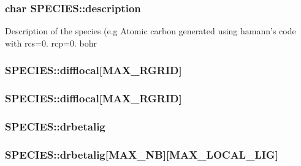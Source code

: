 \hypertarget{struct_s_p_e_c_i_e_s_adeaff9956fe2e820c6050e7a2dee34d3}{
\subsubsection[{description}]{\setlength{\rightskip}{0pt plus 5cm}char S\-P\-E\-C\-I\-E\-S\-::description}}\label{struct_s_p_e_c_i_e_s_adeaff9956fe2e820c6050e7a2dee34d3}
Description of the species (e.\-g Atomic carbon generated using hamann's code with rcs=0. rcp=0. bohr \hypertarget{struct_s_p_e_c_i_e_s_ac9604ebb323031275c739b0195d10cb7}{
\subsubsection[{difflocal}]{ S\-P\-E\-C\-I\-E\-S\-::difflocal\mbox{[}{\bf M\-A\-X\-\_\-\-R\-G\-R\-I\-D}\mbox{]}}}\label{struct_s_p_e_c_i_e_s_ac9604ebb323031275c739b0195d10cb7}
\hypertarget{struct_s_p_e_c_i_e_s_afa8b21cf611f065762cbff670d18b6b4}{
\subsubsection[{difflocal}]{ S\-P\-E\-C\-I\-E\-S\-::difflocal\mbox{[}{\bf M\-A\-X\-\_\-\-R\-G\-R\-I\-D}\mbox{]}}}\label{struct_s_p_e_c_i_e_s_afa8b21cf611f065762cbff670d18b6b4}
\hypertarget{struct_s_p_e_c_i_e_s_a12daf913281dc6948f9fc5411848e644}{
\subsubsection[{drbetalig}]{ S\-P\-E\-C\-I\-E\-S\-::drbetalig}}\label{struct_s_p_e_c_i_e_s_a12daf913281dc6948f9fc5411848e644}
\hypertarget{struct_s_p_e_c_i_e_s_a016889bd9657529919e814648d92665c}{
\subsubsection[{drbetalig}]{ S\-P\-E\-C\-I\-E\-S\-::drbetalig\mbox{[}{\bf M\-A\-X\-\_\-\-N\-B}\mbox{]}\mbox{[}{\bf M\-A\-X\-\_\-\-L\-O\-C\-A\-L\-\_\-\-L\-I\-G}\mbox{]}}}\label{struct_s_p_e_c_i_e_s_a016889bd9657529919e814648d92665c}
